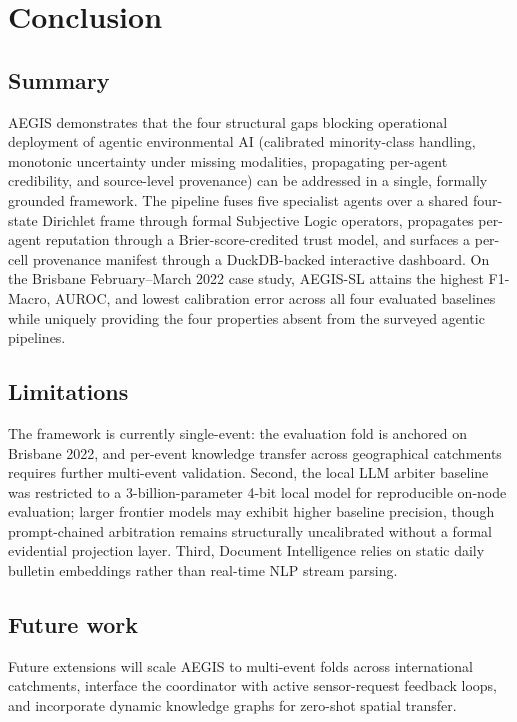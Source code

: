 \section{Conclusion}\label{sec:conclusion}

\subsection{Summary}

AEGIS demonstrates that the four structural gaps blocking operational deployment of agentic environmental AI (calibrated minority-class handling, monotonic uncertainty under missing modalities, propagating per-agent credibility, and source-level provenance) can be addressed in a single, formally grounded framework. The pipeline fuses five specialist agents over a shared four-state Dirichlet frame through formal Subjective Logic operators, propagates per-agent reputation through a Brier-score-credited trust model, and surfaces a per-cell provenance manifest through a DuckDB-backed interactive dashboard. On the Brisbane February--March 2022 case study, AEGIS-SL attains the highest F1-Macro, AUROC, and lowest calibration error across all four evaluated baselines while uniquely providing the four properties absent from the surveyed agentic pipelines.

\subsection{Limitations}

The framework is currently single-event: the evaluation fold is anchored on Brisbane 2022, and per-event knowledge transfer across geographical catchments requires further multi-event validation. Second, the local LLM arbiter baseline was restricted to a 3-billion-parameter 4-bit local model for reproducible on-node evaluation; larger frontier models may exhibit higher baseline precision, though prompt-chained arbitration remains structurally uncalibrated without a formal evidential projection layer. Third, Document Intelligence relies on static daily bulletin embeddings rather than real-time NLP stream parsing.

\subsection{Future work}

Future extensions will scale AEGIS to multi-event folds across international catchments, interface the coordinator with active sensor-request feedback loops, and incorporate dynamic knowledge graphs for zero-shot spatial transfer.
